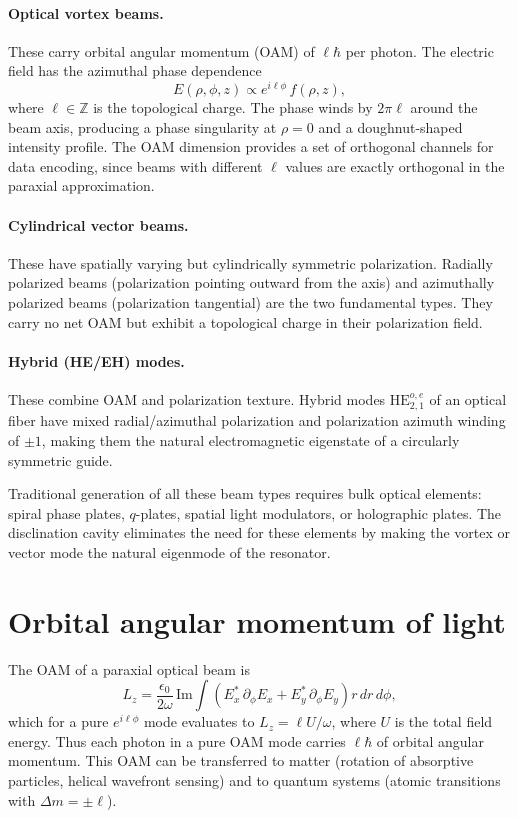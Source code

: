 \documentclass[12pt,a4paper,oneside]{book}
\theoremstyle{plain}
\theoremstyle{definition}
\theoremstyle{remark}
\newcommand{\eps}{\epsilon}
\newcommand{\om}{\omega}
\begin{document}
\paragraph{Optical vortex beams.} These carry orbital angular momentum (OAM) of $\ell\hbar$ per photon. The electric field has the azimuthal phase dependence
\begin{equation}
  E(\rho,\phi,z) \propto e^{i\ell\phi}\,f(\rho,z),
  \label{eq:vortex-phase}
\end{equation}
where $\ell \in \mathbb{Z}$ is the topological charge. The phase winds by $2\pi\ell$ around the beam axis, producing a phase singularity at $\rho = 0$ and a doughnut-shaped intensity profile. The OAM dimension provides a set of orthogonal channels for data encoding, since beams with different $\ell$ values are exactly orthogonal in the paraxial approximation.

\paragraph{Cylindrical vector beams.} These have spatially varying but cylindrically symmetric polarization. Radially polarized beams (polarization pointing outward from the axis) and azimuthally polarized beams (polarization tangential) are the two fundamental types. They carry no net OAM but exhibit a topological charge in their polarization field.

\paragraph{Hybrid (HE/EH) modes.} These combine OAM and polarization texture. Hybrid modes $\mathrm{HE}_{2,1}^{o,e}$ of an optical fiber have mixed radial/azimuthal polarization and polarization azimuth winding of $\pm 1$, making them the natural electromagnetic eigenstate of a circularly symmetric guide.

Traditional generation of all these beam types requires bulk optical elements: spiral phase plates, $q$-plates, spatial light modulators, or holographic plates. The disclination cavity eliminates the need for these elements by making the vortex or vector mode the natural eigenmode of the resonator.

\section{Orbital angular momentum of light}
\label{sec:oam}

The OAM of a paraxial optical beam is
\begin{equation}
  L_z = \frac{\eps_0}{2\om}\,\mathrm{Im}\int \left(E_x^*\,\partial_\phi E_x + E_y^*\,\partial_\phi E_y\right)r\,dr\,d\phi,
\end{equation}
which for a pure $e^{i\ell\phi}$ mode evaluates to $L_z = \ell U/\om$, where $U$ is the total field energy. Thus each photon in a pure OAM mode carries $\ell\hbar$ of orbital angular momentum. This OAM can be transferred to matter (rotation of absorptive particles, helical wavefront sensing) and to quantum systems (atomic transitions with $\Delta m = \pm\ell$).
\end{document}
